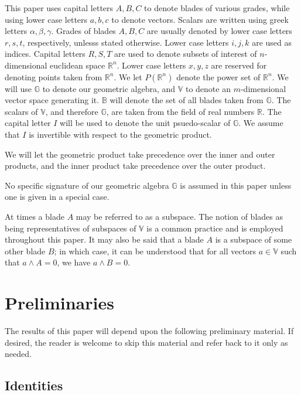 \documentclass{birkjour}
\theoremstyle{definition}
\theoremstyle{remark}
\numberwithin{equation}{section}
\newcommand{\R}{\mathbb{R}}
\newcommand{\B}{\mathbb{B}}
\newcommand{\G}{\mathbb{G}}
\newcommand{\V}{\mathbb{V}}
\begin{document}
This paper uses capital letters $A,B,C$ to denote blades of various grades,
while using lower case letters $a,b,c$ to denote vectors.  Scalars are written
using greek letters $\alpha,\beta,\gamma$.  Grades of blades $A,B,C$ are usually
denoted by lower case letters $r,s,t$, respectively, unlesss stated otherwise.  Lower case letters $i,j,k$ are
used as indices.  Capital letters $R,S,T$
are used to denote subsets of interest of $n$-dimensional euclidean space $\R^n$.
Lower case letters $x,y,z$ are reserved for denoting points taken from $\R^n$.  We
let $P(\R^n)$ denote the power set of $\R^n$.
We will use $\G$ to denote our geometric algebra, and $\V$ to denote an $m$-dimensional vector
space generating it.  $\B$ will denote the set of all blades taken from $\G$.  The
scalars of $\V$, and therefore $\G$, are taken from the field of real numbers $\R$.
The capital letter $I$ will be used to denote the unit psuedo-scalar of $\G$.  We assume
that $I$ is invertible with respect to the geometric product.

We will let the geometric product take precedence over the inner and outer products,
and the inner product take precedence over the outer product.

No specific signature of our geometric algebra $\G$ is assumed in this paper unless
one is given in a special case.

At times a blade $A$ may be referred to as a subspace.  The notion of blades as being
representatives of subspaces of $\V$ is a common practice and is employed throughout this paper.
It may also be said that a blade $A$ is a subspace of some other blade $B$; in which case,
it can be understood that for all vectors $a\in\V$ such that $a\wedge A=0$, we have $a\wedge B=0$.

\section{Preliminaries}

The results of this paper will depend upon the following preliminary material.
If desired, the reader is welcome to skip this material and refer back to it only as needed.

\subsection{Identities}
\end{document}
